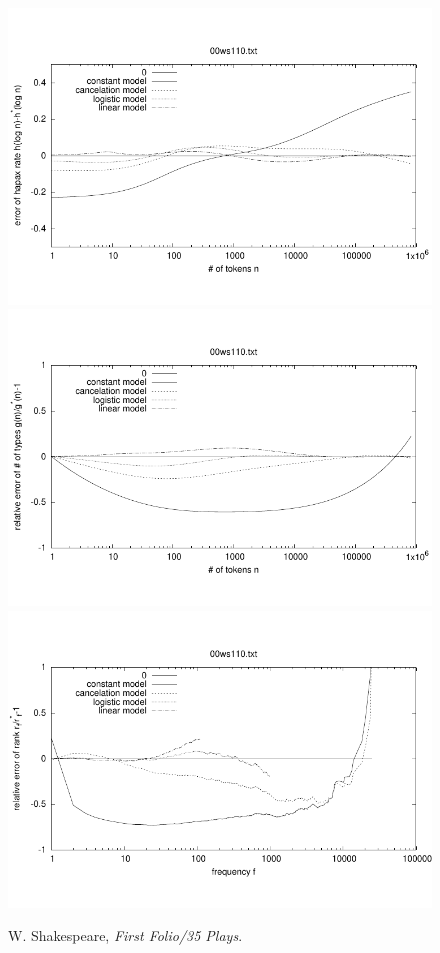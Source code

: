 \documentclass[a4paper,12pt]{article}
\begin{document}
\begin{figure}[p]
  \centering
  \vspace{-2em}
  \includegraphics[width=0.8\columnwidth]{output/herdan/00ws110_27/token_ratio_residual.pdf}
  \\[-3em]
  \includegraphics[width=0.8\columnwidth]{output/herdan/00ws110_27/token_residual.pdf}
  \\[-3em]
  \includegraphics[width=0.8\columnwidth]{output/herdan/00ws110_27/frequency_residual.pdf}
  \vspace{-2em}
  \caption{W. Shakespeare, \emph{First Folio/35 Plays}.\label{fig00ws110R}}
\end{figure}
\end{document}
